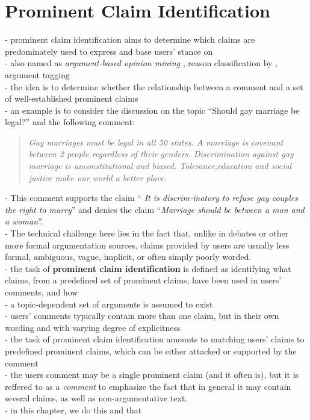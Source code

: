 \chapter{Prominent Claim Identification}

- prominent claim identification aims to determine 
which claims are predominately used to express and base
users' stance on \\
- also named as \textit{argument-based opinion mining} \citep{boltuzic2014back}, 
reason classification by \citep{hasan2014you}, argument tagging 
\citep{sobhani2015argumentation} \\
- the idea is to determine whether the relationship between a comment and a set
of well-established prominent claims \\
- an example is to consider the discussion on the topic ``Should gay marriage be legal?''
and the following comment:
\begin{quote}
\emph{
Gay marriages must be legal in all 50 states. A marriage is covenant
between 2 people regardless of their genders. Discrimination against
gay marriage is unconstitutional and biased. Tolerance,education and
social justice make our world a better place.
}
\end{quote}
- This comment supports the claim ``
\textit{It is discrim-inatory to refuse gay couples
the right to marry}''
and denies the claim ``\textit{Marriage should be between a man
and a woman}''. \\
- The technical challenge here lies in the fact that, unlike in
debates or other more formal argumentation sources, claims provided by 
users are usually less formal, ambiguous, vague, implicit, or often
simply poorly worded. \\
- the task of \textbf{prominent claim identification} is defined
as identifying what claims, from  a  predefined  set  of  prominent claims, have
been used in users' comments, and how \\
- a topic-dependent set of arguments is assumed to exist \\
- users' comments typically contain more than one claim, but in 
their own wording and with varying degree of explicitness \\
- the task of prominent claim identification amounts to 
matching users' claims to predefined prominent claims, which 
can be either attacked or supported by the comment \\
- the users comment may be a single prominent claim
(and it often is), but it is reffered to as a \textit{comment}
to emphasize the fact that in general it may contain several claims, 
as well as non-argumentative text. \\
- in this chapter, we do this and that \\

